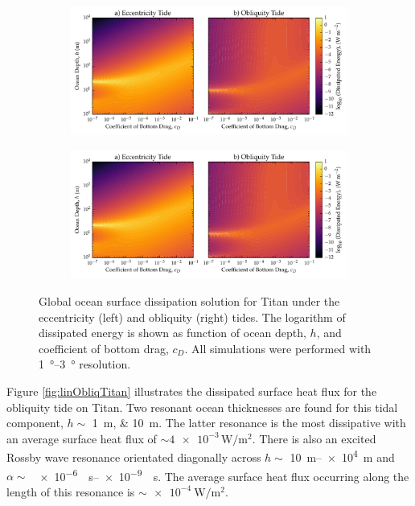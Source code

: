 \begin{figure}[!t]
    \centering
    \begin{subfigure}[t]{0.85\linewidth} %
        \includegraphics[width=\linewidth]{Figures/titan_bottom}
        \label{fig:botEccTitan}
    \end{subfigure}
    \begin{subfigure}[t]{0\linewidth} %
         \includegraphics[width=\linewidth]{Figures/titan_bottom}
         \label{fig:botObliqTitan}   
    \end{subfigure}
    \vspace{-0.5cm}
\caption{Global ocean surface dissipation solution for Titan under the eccentricity (left) and obliquity (right) tides. The logarithm of dissipated energy is shown as function of ocean depth, $h$, and coefficient of bottom drag, $c_D$. All simulations were performed with \SIrange{1}{3}{\degree} resolution. \label{fig:botTitan}}
\end{figure}


Figure \ref{fig:linObliqTitan} illustrates the dissipated surface heat flux for the obliquity tide on Titan. Two resonant ocean thicknesses are found for this tidal component, $h \sim$ \SIlist{1;10}{\metre}. The latter resonance is the most dissipative with an average surface heat flux of $\sim \num{4e-3}\, \si{\watt\per\square\metre}$. There is also an excited Rossby wave resonance orientated diagonally across $h \sim$ \SIrange{10}{e4}{\metre} and \hbox{$\alpha \sim$ \SIrange{e-6}{e-9}{\per\second}}. The average surface heat flux occurring along the length of this resonance is $\sim \SI{e-4}{\watt\per\square\metre}$. 

